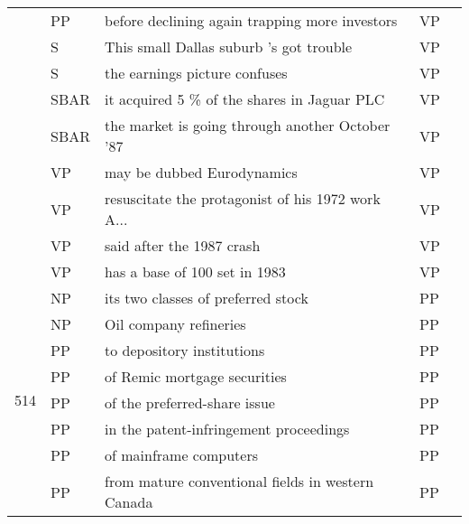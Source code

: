 \documentclass[11pt]{article}
\newcommand{\cmark}{\text{\ding{51}}}
\newcommand{\xmark}{\text{\ding{55}}}
\begin{document}
\begin{table*}[t]
\begin{center}
{\begin{tabular}{|l|l|l|l|l|}
    & PP &     before declining again trapping more investors &        VP &   \textcolor{alizarin}{\xmark} \\
    & S &            This small Dallas suburb 's got trouble &        VP &   \textcolor{alizarin}{\xmark} \\
    & S &                      the earnings picture confuses &        VP &   \textcolor{alizarin}{\xmark} \\
    & SBAR &        it acquired 5 \% of the shares in Jaguar PLC &        VP &   \textcolor{alizarin}{\xmark} \\
    & SBAR &    the market is going through another October '87 &        VP &   \textcolor{alizarin}{\xmark} \\
    & VP &                         may be dubbed Eurodynamics &        VP &    \textcolor{cadmiumgreen}{\cmark} \\
    & VP &  resuscitate the protagonist of his 1972 work A... &        VP &    \textcolor{cadmiumgreen}{\cmark} \\
    & VP &                          said after the 1987 crash &        VP &    \textcolor{cadmiumgreen}{\cmark} \\
    & VP &                      has a base of 100 set in 1983 &        VP &    \textcolor{cadmiumgreen}{\cmark} \\
\hline
\multirow{10}{*}{514} & NP &                 its two classes of preferred stock &        PP &   \textcolor{alizarin}{\xmark} \\
    & NP &                             Oil company refineries &        PP &   \textcolor{alizarin}{\xmark} \\
    & PP &                         to depository institutions &        PP &    \textcolor{cadmiumgreen}{\cmark} \\
    & PP &                       of Remic mortgage securities &        PP &    \textcolor{cadmiumgreen}{\cmark} \\
    & PP &                       of the preferred-share issue &        PP &    \textcolor{cadmiumgreen}{\cmark} \\
    & PP &             in the patent-infringement proceedings &        PP &    \textcolor{cadmiumgreen}{\cmark} \\
    & PP &                             of mainframe computers &        PP &    \textcolor{cadmiumgreen}{\cmark} \\
    & PP &  from mature conventional fields in western Canada &        PP &    \textcolor{cadmiumgreen}{\cmark} \\

\end{tabular}}
\end{center}
\end{table*}
\end{document}

